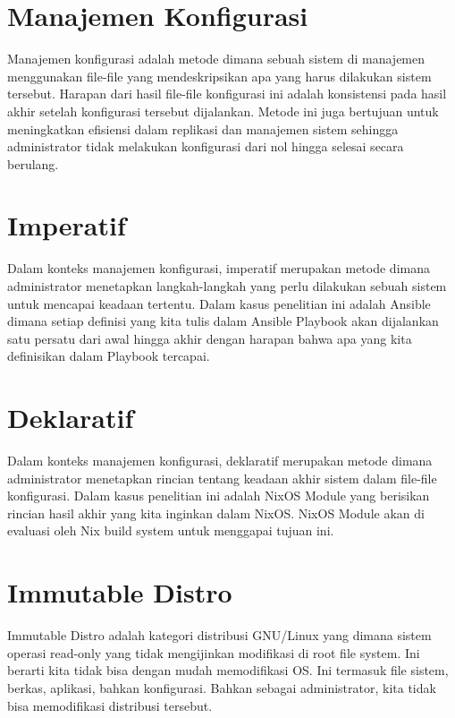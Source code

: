 \documentclass[10pt,]{report}
\begin{document}
\section{Manajemen Konfigurasi}
\begin{adjustwidth}{20pt}{}
	\vspace{-3mm}
	Manajemen konfigurasi adalah metode dimana sebuah sistem di manajemen
	menggunakan file-file yang mendeskripsikan apa yang harus dilakukan sistem
	tersebut. Harapan dari hasil file-file konfigurasi ini adalah konsistensi
	pada hasil akhir setelah konfigurasi tersebut dijalankan. Metode ini juga
	bertujuan untuk meningkatkan efisiensi dalam replikasi dan manajemen sistem
	sehingga administrator tidak melakukan konfigurasi dari nol hingga selesai
	secara berulang.
\end{adjustwidth}
\section{Imperatif}
\begin{adjustwidth}{20pt}{}
	\vspace{-3mm}
	Dalam konteks manajemen konfigurasi, imperatif merupakan metode dimana
	administrator menetapkan langkah-langkah yang perlu dilakukan sebuah sistem
	untuk mencapai keadaan tertentu. Dalam kasus penelitian ini adalah Ansible
	dimana setiap definisi yang kita tulis dalam Ansible Playbook akan dijalankan
	satu persatu dari awal hingga akhir dengan harapan bahwa apa yang kita
	definisikan dalam Playbook tercapai.
\end{adjustwidth}
\section{Deklaratif}
\begin{adjustwidth}{20pt}{}
	\vspace{-3mm}
	Dalam konteks manajemen konfigurasi, deklaratif merupakan metode dimana
	administrator menetapkan rincian tentang keadaan akhir sistem dalam file-file
	konfigurasi. Dalam kasus penelitian ini adalah NixOS Module yang berisikan
	rincian hasil akhir yang kita inginkan dalam NixOS. NixOS Module akan di
	evaluasi oleh Nix build system untuk menggapai tujuan ini.
\end{adjustwidth}
\section{Immutable Distro}
\begin{adjustwidth}{20pt}{}
	\vspace{-3mm}
	Immutable Distro adalah kategori distribusi GNU/Linux yang dimana sistem
	operasi read-only yang tidak mengijinkan modifikasi di root file system. Ini
	berarti kita tidak bisa dengan mudah memodifikasi OS. Ini termasuk file
	sistem, berkas, aplikasi, bahkan konfigurasi. Bahkan sebagai administrator,
	kita tidak bisa memodifikasi distribusi tersebut.
\end{adjustwidth}
\end{document}
